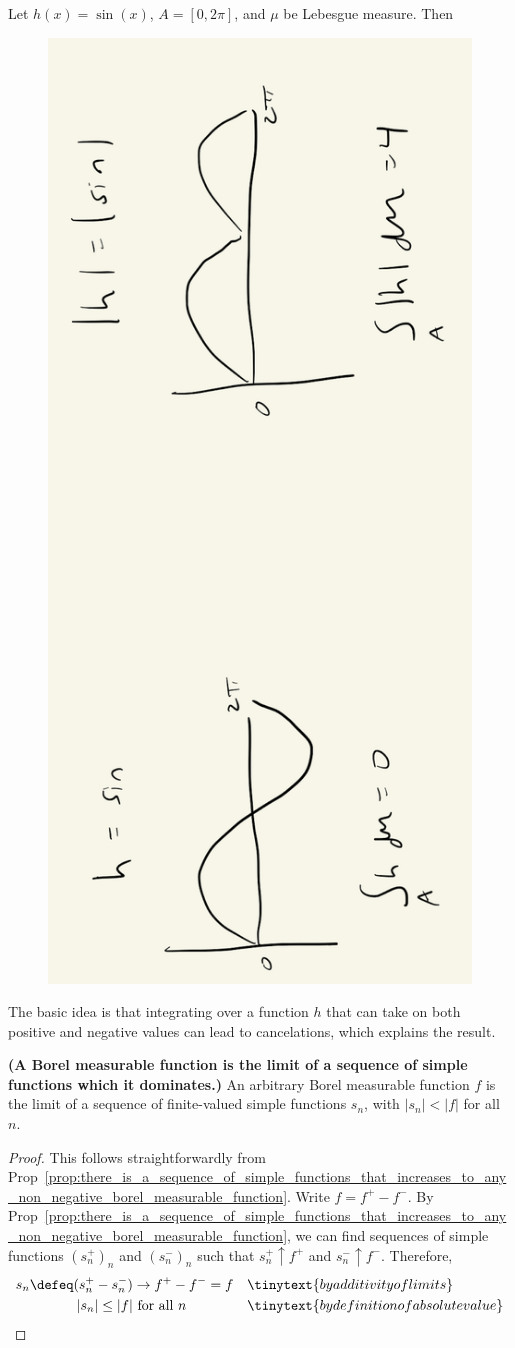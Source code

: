 \documentclass{article} %
\begin{document}
\begin{example}{}
Let $h(x) = \sin(x)$, $A=[0,2\pi]$, and $\mu$ be Lebesgue measure. Then 
\begin{figure}[H]
\centering 
\includegraphics[width=.2\linewidth, angle=270]{images/triangle_inequality_for_integrals}	
\end{figure}
The basic idea is that integrating over a function $h$ that can take on both positive and negative values can lead to cancelations, which explains the result.	
\label{ex:simple_example_of_triangle_inequality}
\end{example}

\begin{proposition}\textbf{(A Borel measurable function is the limit of a sequence of simple functions which it dominates.)}
An arbitrary Borel measurable function $f$ is the limit of a sequence of finite-valued simple functions $s_n$, with $|s_n|<|f|$ for all $n$.
\label{prop:measurable_function_is_limit_of_simple_functions_which_it_dominates}
\end{proposition}

\begin{proof}
This follows straightforwardly from Prop~\ref{prop:there_is_a_sequence_of_simple_functions_that_increases_to_any_non_negative_borel_measurable_function}.  Write $f = f^+ - f^-$.  By Prop~\ref{prop:there_is_a_sequence_of_simple_functions_that_increases_to_any_non_negative_borel_measurable_function}, we can find sequences of simple functions $(s_n^+)_n$ and $(s_n^-)_n$  such that $s_n^+ \uparrow f^+$ and $s_n^- \uparrow f^-$.   Therefore,
\begin{align*}
s_n \defeq (s_n^+ - s_n^-) &\to f^+ - f^- = f && \tinytext{by additivity of limits} \\ 
|s_n| \leq |f| & \text { for all } n && \tinytext{by definition of absolute value}	
\end{align*}

\end{proof}
\end{document}

